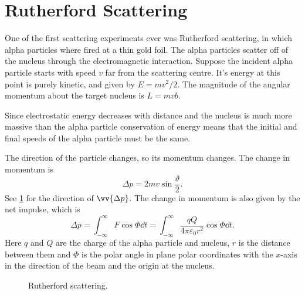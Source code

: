     \section{Rutherford Scattering}
    One of the first scattering experiments ever was Rutherford scattering, in which alpha particles where fired at a thin gold foil.
    The alpha particles scatter off of the nucleus through the electromagnetic interaction.
    Suppose the incident alpha particle starts with speed \(v\) far from the scattering centre.
    It's energy at this point is purely kinetic, and given by \(E = mv^2/2\).
    The magnitude of the angular momentum about the target nucleus is \(L = mvb\).
    
    Since electrostatic energy decreases with distance and the nucleus is much more massive than the alpha particle conservation of energy means that the initial and final speeds of the alpha particle must be the same.
    
    The direction of the particle changes, so its momentum changes.
    The change in momentum is
    \begin{equation}
        \Delta p = 2mv\sin\frac{\vartheta}{2}.
    \end{equation}
    See \cref{fig:rutherford scattering} for the direction of \(\vv{\Delta p}\).
    The change in momentum is also given by the net impulse, which is
    \begin{equation}
        \Delta p = \int_{-\infty}^{\infty} F\cos\Phi \dd{t} = \int_{-\infty}^{\infty} \frac{qQ}{4\pi\varepsilon_0r^2}\cos\Phi \dd{t}.
    \end{equation}
    Here \(q\) and \(Q\) are the charge of the alpha particle and nucleus, \(r\) is the distance between them and \(\Phi\) is the polar angle in plane polar coordinates with the \(x\)-axis in the direction of the beam and the origin at the nucleus.
    
    \begin{figure}
        \caption{Rutherford scattering.}
        \label{fig:rutherford scattering}
    \end{figure}
    
